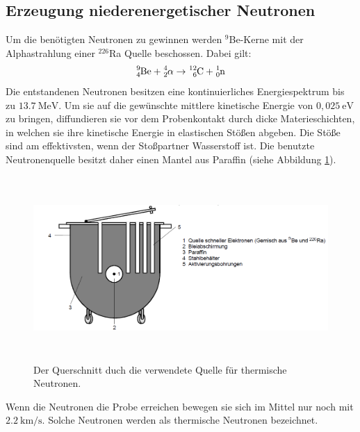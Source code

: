  \subsection{Erzeugung niederenergetischer Neutronen}
 Um die benötigten Neutronen zu gewinnen werden $^9$Be-Kerne mit der Alphastrahlung einer $^{226}$Ra Quelle beschossen. Dabei gilt:
\begin{align}
  \ce{^{9}_{4}Be} + \ce{^{4}_{2}\alpha} \rightarrow \ce{^{12}_{6}C} + \ce{^{1}_{0}n}
\end{align}
 Die entstandenen Neutronen besitzen eine kontinuierliches Energiespektrum bis zu $13.7\ \text{MeV}$. Um sie auf die 
 gewünschte mittlere kinetische Energie von $0,025 \ \text{eV}$ zu bringen, diffundieren sie vor dem Probenkontakt durch dicke Materieschichten, in welchen sie 
 ihre kinetische Energie in elastischen Stößen abgeben. Die Stöße sind am effektivsten, wenn der Stoßpartner Wasserstoff ist.  Die benutzte Neutronenquelle
 besitzt daher einen Mantel aus Paraffin (siehe Abbildung \ref{fig:Querschnitt}).
 \begin{figure}[H]
  \centering
  \includegraphics[width = 14cm, height= 7cm]{Querschnittmit.png}
  \caption{Der Querschnitt duch die verwendete Quelle für thermische Neutronen.\cite{1}}
  \label{fig:Querschnitt}
\end{figure}
\noindent
 Wenn die Neutronen die Probe erreichen bewegen sie sich im Mittel nur noch mit $\SI{2.2}{\kilo\meter\per\second}$. Solche Neutronen werden 
 als thermische Neutronen bezeichnet.
